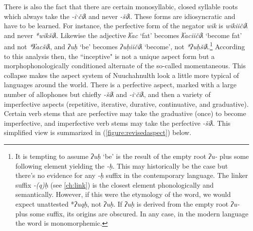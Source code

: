 There is also the fact that there are certain monosyllabic, closed syllable roots which always take the \textit{-iˑčiƛ} and never \textit{-šiƛ}. These forms are idiosyncratic and have to be learned. For instance, the perfective form of the negator \textit{wik} is \textit{wikiičiƛ} and never \textit{*wikšiƛ}. Likewise the adjective \textit{ƛ̓ac} `fat' becomes \textit{ƛ̓aciičiƛ} `become fat' and not \textit{*ƛ̓acšiƛ}, and \textit{ʔuḥ} `be' becomes \textit{ʔuḥiičiƛ} `become', not \textit{*ʔuḥšiƛ}.\footnote{It is tempting to assume \textit{ʔuḥ} `be' is the result of the empty root \textit{ʔu-} plus some following element yielding the \textit{-ḥ}. This may historically be the case but there's no evidence for any \textit{-ḥ} suffix in the contemporary language. The linker suffix \textit{-(q)ḥ} (see \cref{ch:link}) is the closest element phonologically and semantically. However, if this were the etymology of the word, we would expect unattested *\textit{ʔuqḥ}, not \textit{ʔuḥ}. If \textit{ʔuḥ} is derived from the empty root \textit{ʔu-} plus some suffix, its origins are obscured. In any case, in the modern language the word is monomorphemic.} According to this analysis then, the ``inceptive" is not a unique aspect form but a morphophonologically conditioned alternate of the so-called momentaneous. This collapse makes the aspect system of Nuuchahnulth look a little more typical of languages around the world. There is a perfective aspect, marked with a large number of allophones but chiefly \textit{-šiƛ} and \textit{-iˑčiƛ}, and then a variety of imperfective aspects (repetitive, iterative, durative, continuative, and graduative). Certain verb stems that are perfective may take the graduative (once) to become imperfective, and imperfective verb stems may take the perfective \textit{-šiƛ}. This simplified view is summarized in (\ref{figure:revisedaspect}) below.

